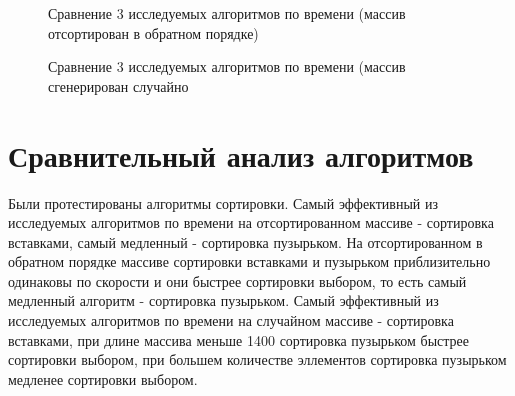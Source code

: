 \begin{figure}[H]
    \caption{Сравнение 3 исследуемых алгоритмов по времени (массив отсортирован в обратном порядке)}
    \label{ris:graph2}
\end{figure}

\begin{figure}[H]
    \caption{Сравнение 3 исследуемых алгоритмов по времени (массив сгенерирован случайно}
    \label{ris:graph3}
\end{figure}

\section{Сравнительный анализ алгоритмов}\label{comparepart}

Были протестированы алгоритмы сортировки. Самый эффективный из исследуемых алгоритмов по времени на отсортированном массиве - сортировка 
вставками, самый медленный - сортировка пузырьком. На отсортированном в обратном порядке массиве сортировки вставками и пузырьком 
приблизительно одинаковы по скорости и они быстрее сортировки выбором, то есть самый медленный алгоритм - сортировка пузырьком. Самый 
эффективный из исследуемых алгоритмов по времени на случайном массиве - сортировка вставками, при длине массива меньше 1400 сортировка 
пузырьком быстрее сортировки выбором, при большем количестве эллементов сортировка пузырьком медленее сортировки выбором. 


